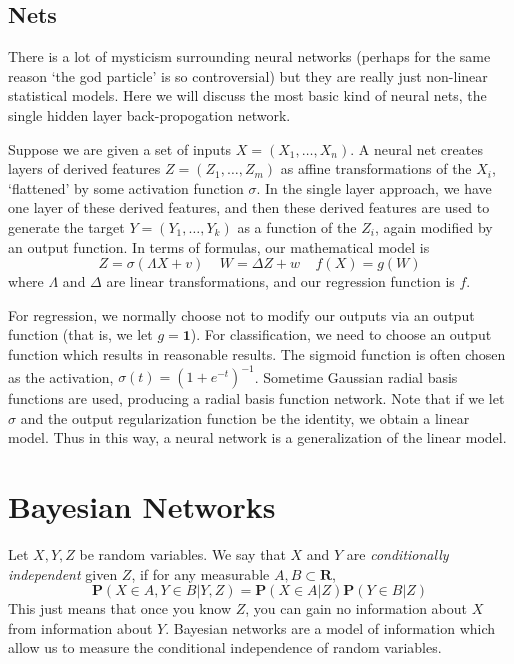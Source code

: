 \section{Nets}

There is a lot of mysticism surrounding neural networks (perhaps for the same reason `the god particle' is so controversial) but they are really just non-linear statistical models. Here we will discuss the most basic kind of neural nets, the single hidden layer back-propogation network.

Suppose we are given a set of inputs $X = (X_1, \dots, X_n)$. A neural net creates layers of derived features $Z = (Z_1, \dots, Z_m)$ as affine transformations of the $X_i$, `flattened' by some activation function $\sigma$. In the single layer approach, we have one layer of these derived features, and then these derived features are used to generate the target $Y = (Y_1, \dots, Y_k)$ as a function of the $Z_i$, again modified by an output function. In terms of formulas, our mathematical model is
%
\[ Z = \sigma(\Lambda X + v)\ \ \ \ \ W = \Delta Z + w\ \ \ \ \ f(X) = g(W) \]
%
where $\Lambda$ and $\Delta$ are linear transformations, and our regression function is $f$.

For regression, we normally choose not to modify our outputs via an output function (that is, we let $g = \mathbf{1}$). For classification, we need to choose an output function which results in reasonable results. The sigmoid function is often chosen as the activation, $\sigma(t) = (1 + e^{-t})^{-1}$. Sometime Gaussian radial basis functions are used, producing a radial basis function network. Note that if we let $\sigma$ and the output regularization function be the identity, we obtain a linear model. Thus in this way, a neural network is a generalization of the linear model.

\chapter{Bayesian Networks}

Let $X,Y,Z$ be random variables. We say that $X$ and $Y$ are \emph{conditionally independent} given $Z$, if for any measurable $A,B \subset \mathbf{R}$,
%
\[ \mathbf{P}(X \in A,Y \in B|Y,Z) = \mathbf{P}(X \in A|Z)\mathbf{P}(Y \in B|Z) \]
%
This just means that once you know $Z$, you can gain no information about $X$ from information about $Y$. Bayesian networks are a model of information which allow us to measure the conditional independence of random variables.

